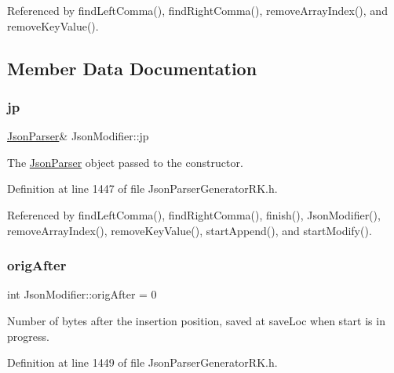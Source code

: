 Referenced by find\+Left\+Comma(), find\+Right\+Comma(), remove\+Array\+Index(), and remove\+Key\+Value().



\subsection{Member Data Documentation}
\mbox{\label{class_json_modifier_ab78d43036cea562e37640ae12e20b706}} 
\subsubsection{\texorpdfstring{jp}{jp}}
{\footnotesize\ttfamily \hyperlink{class_json_parser}{Json\+Parser}\& Json\+Modifier\+::jp\hspace{0.3cm}{\ttfamily [protected]}}



The \hyperlink{class_json_parser}{Json\+Parser} object passed to the constructor. 



Definition at line 1447 of file Json\+Parser\+Generator\+R\+K.\+h.



Referenced by find\+Left\+Comma(), find\+Right\+Comma(), finish(), Json\+Modifier(), remove\+Array\+Index(), remove\+Key\+Value(), start\+Append(), and start\+Modify().

\mbox{\label{class_json_modifier_aec8c0683c15ad68dc1cb8180321bf902}} 
\subsubsection{\texorpdfstring{orig\+After}{origAfter}}
{\footnotesize\ttfamily int Json\+Modifier\+::orig\+After = 0\hspace{0.3cm}{\ttfamily [protected]}}



Number of bytes after the insertion position, saved at save\+Loc when start is in progress. 



Definition at line 1449 of file Json\+Parser\+Generator\+R\+K.\+h.



